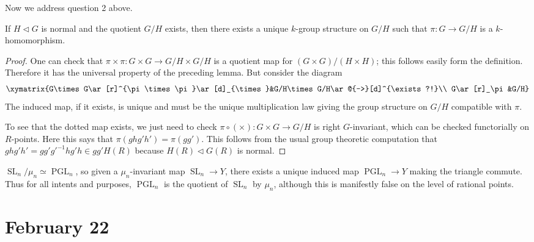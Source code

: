 \documentclass[10pt]{article}
\newcommand{\nsg}{\vartriangleleft}
\newcommand{\PGL}{\operatorname{PGL}}
\newcommand{\SL}{\operatorname{SL}}
\renewcommand{\(}{\left(}
\renewcommand{\)}{\right)}
\numberwithin{thm}{subsection}
\begin{document}
Now we address question 2 above.
\begin{cor}
If $H\nsg G$ is normal and the quotient $G/H$ exists,
then there exists a unique $k$-group structure on $G/H$ such that $\pi:G\to G/H$
is a $k$-homomorphism.
\end{cor}
\begin{proof}
One can check that $\pi\times\pi:G\times G\to G/H\times G/H$ is a quotient map
for $(G\times G)/(H\times H)$; this follows easily form the definition.
Therefore it has the universal property of the preceding lemma.
But consider the diagram
\[\xymatrix{G\times G\ar[r]^{\pi\times\pi}\ar[d]_{\times}&G/H\times G/H\ar@{-->}[d]^{\exists?!}\\
G\ar[r]_\pi&G/H}\]
The induced map, if it exists, is unique
and must be the unique multiplication law giving the group structure on $G/H$ compatible with $\pi$.

To see that the dotted map exists, we just need to check $\pi\circ(\times):G\times G\to G/H$ is right $G$-invariant,
which can be checked functorially on $R$-points.
Here this says that $\pi(ghg'h')=\pi(gg')$.
This follows from the usual group theoretic
computation
that $ghg'h'=gg'g'^{-1}hg'h\in gg'H(R)$
because $H(R)\nsg G(R)$ is normal. 
\end{proof}
\begin{ex}
$\SL_n/\mu_n\simeq \PGL_n$,
so given a $\mu_n$-invariant map $\SL_n\to Y$,
there exists a unique induced map $\PGL_n\to Y$ making the triangle commute.
Thus for all intents and purposes,
$\PGL_n$ is the quotient
of $\SL_n$ by $\mu_n$,
although this is manifestly false
on the level of rational points.
\end{ex}
\section{February 22}
\end{document}
